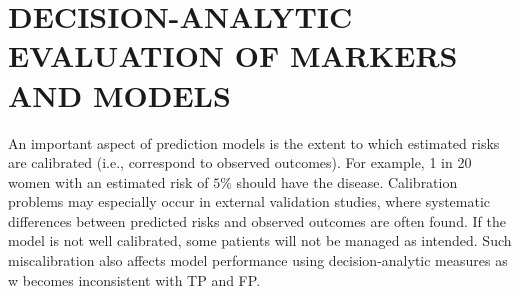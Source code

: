 \section{DECISION-ANALYTIC EVALUATION OF MARKERS AND MODELS}
	An important aspect of prediction models is the extent to which estimated risks are calibrated (i.e., correspond to observed outcomes). 
	For example, 1 in 20 women with an estimated risk of $5\%$ should have the disease. 
	Calibration problems may especially occur in external validation studies, where systematic differences between predicted risks and observed outcomes are often found. 
	If the model is not well calibrated, some patients will not be managed as intended. 
	Such miscalibration also affects model performance using decision-analytic measures as w becomes inconsistent with TP and FP.
	
	